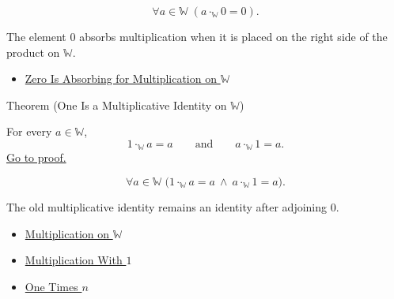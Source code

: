 \begin{remark*}
\[
\forall a\in\mathbb{W}\;(a\cdot_{\mathbb{W}}0=0).
\]
\end{remark*}

\begin{remark*}[Interpretation]
The element $0$ absorbs multiplication when it is placed on the right side of
the product on $\mathbb{W}$.
\end{remark*}

\begin{dependencies}
\begin{itemize}
  \item \hyperref[thm:zero-absorbing-for-multiplication-on-w]{Zero Is Absorbing for Multiplication on $\mathbb{W}$}
\end{itemize}
\end{dependencies}

\begin{theorembox}{Theorem (One Is a Multiplicative Identity on \texorpdfstring{$\mathbb{W}$}{W})}
\begin{theorem}
\label{thm:one-multiplicative-identity-on-w}
For every $a\in\mathbb{W}$,
\[
1\cdot_{\mathbb{W}}a=a
\qquad\text{and}\qquad
a\cdot_{\mathbb{W}}1=a.
\]
\hyperref[prf:one-multiplicative-identity-on-w]{Go to proof.}
\end{theorem}
\end{theorembox}

\begin{remark*}
\[
\forall a\in\mathbb{W}\;
\bigl(1\cdot_{\mathbb{W}}a=a\ \wedge\ a\cdot_{\mathbb{W}}1=a\bigr).
\]
\end{remark*}

\begin{remark*}[Interpretation]
The old multiplicative identity remains an identity after adjoining $0$.
\end{remark*}

\begin{dependencies}
\begin{itemize}
  \item \hyperref[def:multiplication-on-w]{Multiplication on $\mathbb{W}$}
  \item \hyperref[thm:multiplication-with-one]{Multiplication With $1$}
  \item \hyperref[thm:one-times-n]{One Times $n$}
\end{itemize}
\end{dependencies}

